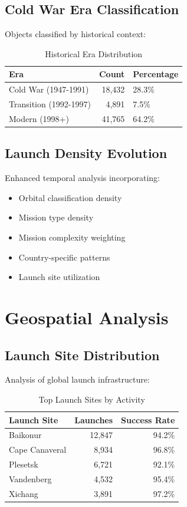 \documentclass[12pt,a4paper]{article}
\begin{document}
\subsection{Cold War Era Classification}
Objects classified by historical context:
\begin{table}[H]
\centering
\begin{tabular}{@{}lrl@{}}
\toprule
\textbf{Era} & \textbf{Count} & \textbf{Percentage} \\
\midrule
Cold War (1947-1991) & 18,432 & 28.3\% \\
Transition (1992-1997) & 4,891 & 7.5\% \\
Modern (1998+) & 41,765 & 64.2\% \\
\bottomrule
\end{tabular}
\caption{Historical Era Distribution}
\end{table}

\subsection{Launch Density Evolution}
Enhanced temporal analysis incorporating:
\begin{itemize}
    \item Orbital classification density
    \item Mission type density  
    \item Mission complexity weighting
    \item Country-specific patterns
    \item Launch site utilization
\end{itemize}

\section{Geospatial Analysis}

\subsection{Launch Site Distribution}
Analysis of global launch infrastructure:

\begin{table}[H]
\centering
\begin{tabular}{@{}lrr@{}}
\toprule
\textbf{Launch Site} & \textbf{Launches} & \textbf{Success Rate} \\
\midrule
Baikonur & 12,847 & 94.2\% \\
Cape Canaveral & 8,934 & 96.8\% \\
Plesetsk & 6,721 & 92.1\% \\
Vandenberg & 4,532 & 95.4\% \\
Xichang & 3,891 & 97.2\% \\
\bottomrule
\end{tabular}
\caption{Top Launch Sites by Activity}
\end{table}
\end{document}
